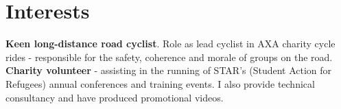 \documentclass[11pt]{article}
\begin{document}
\section*{Interests}

\textbf{Keen long-distance road cyclist}. Role as lead cyclist in AXA charity cycle rides - responsible for the safety, coherence and morale of groups on the road.\\
\noindent \textbf{Charity volunteer} - assisting in the running of STAR's (Student Action for Refugees) annual conferences and training events.
I also provide technical consultancy and have produced promotional videos.

\end{document}
